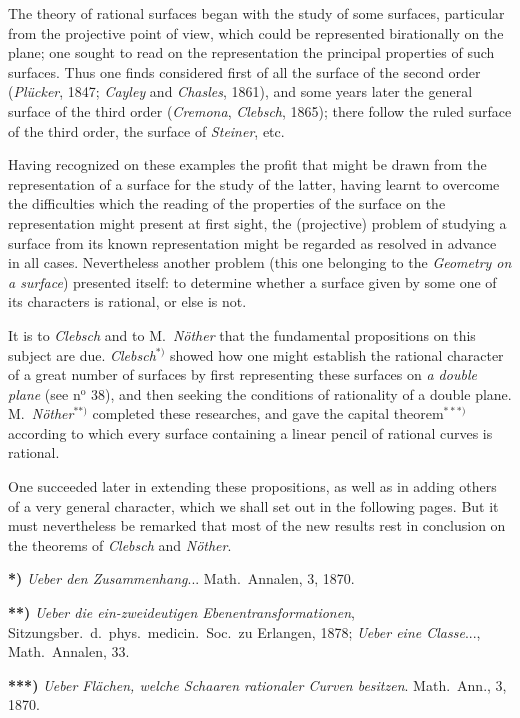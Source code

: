 \documentclass{article}
\begin{document}
The theory of rational surfaces began with the study of some surfaces, particular from the projective point of view, which could be represented birationally on the plane; one sought to read on the representation the principal properties of such surfaces. Thus one finds considered first of all the surface of the second order (\emph{Plücker}, 1847; \emph{Cayley} and \emph{Chasles}, 1861), and some years later the general surface of the third order (\emph{Cremona}, \emph{Clebsch}, 1865); there follow the ruled surface of the third order, the surface of \emph{Steiner}, etc.

Having recognized on these examples the profit that might be drawn from the representation of a surface for the study of the latter, having learnt to overcome the difficulties which the reading of the properties of the surface on the representation might present at first sight, the (projective) problem of studying a surface from its known representation might be regarded as resolved in advance in all cases. Nevertheless another problem (this one belonging to the \emph{Geometry on a surface}) presented itself: to determine whether a surface given by some one of its characters is rational, or else is not.

It is to \emph{Clebsch} and to M.\ \emph{Nöther} that the fundamental propositions on this subject are due. \emph{Clebsch}${}^{*)}$ showed how one might establish the rational character of a great number of surfaces by first representing these surfaces on \emph{a double plane} (see n${}^{\text{o}}$ 38), and then seeking the conditions of rationality of a double plane. M.\ \emph{Nöther}${}^{**)}$ completed these researches, and gave the capital theorem${}^{***)}$ according to which every surface containing a linear pencil of rational curves is rational.

One succeeded later in extending these propositions, as well as in adding others of a very general character, which we shall set out in the following pages. But it must nevertheless be remarked that most of the new results rest in conclusion on the theorems of \emph{Clebsch} and \emph{Nöther}.

\textbf{*)} \emph{Ueber den Zusammenhang}... Math.\ Annalen, 3, 1870.

\textbf{**)} \emph{Ueber die ein-zweideutigen Ebenentransformationen}, Sitzungsber.\ d.\ phys.\ medicin.\ Soc.\ zu Erlangen, 1878; \emph{Ueber eine Classe}..., Math.\ Annalen, 33.

\textbf{***)} \emph{Ueber Flächen, welche Schaaren rationaler Curven besitzen}. Math.\ Ann., 3, 1870.
\end{document}
